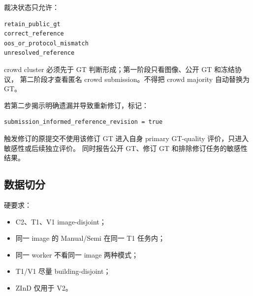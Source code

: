 裁决状态只允许：
\begin{verbatim}
retain_public_gt
correct_reference
oos_or_protocol_mismatch
unresolved_reference
\end{verbatim}

crowd cluster 必须先于 GT 判断形成；第一阶段只看图像、公开 GT 和冻结协议，
第二阶段才查看匿名 crowd submission。不得把 crowd majority 自动替换为 GT。

若第二步揭示明确遗漏并导致重新修订，标记：

\begin{verbatim}
submission_informed_reference_revision = true
\end{verbatim}

触发修订的原提交不使用该修订 GT 进入自身 primary GT-quality 评价，只进入敏感性或后续独立评价。
同时报告公开 GT、修订 GT 和排除修订任务的敏感性结果。

\subsection{数据切分}

硬要求：

\begin{itemize}
  \item C2、T1、V1 image-disjoint；
  \item 同一 image 的 Manual/Semi 在同一 T1 任务内；
  \item 同一 worker 不看同一 image 两种模式；
  \item T1/V1 尽量 building-disjoint；
  \item ZInD 仅用于 V2。
\end{itemize}
